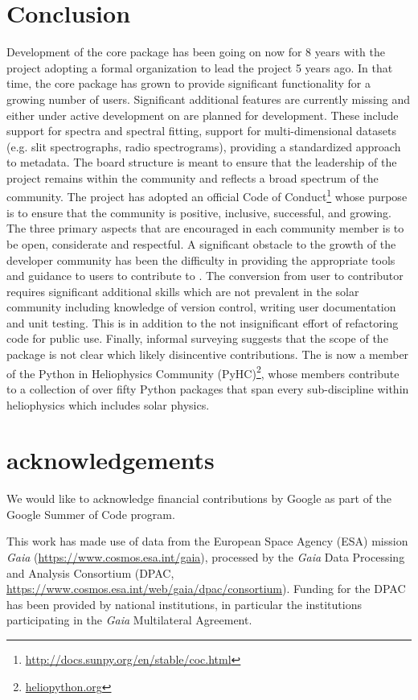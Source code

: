 \section{Conclusion}
\label{sec:conclusion}


Development of the \sunpypkg core package has been going on now for 8 years with the project adopting a formal organization to lead the project 5 years ago.
In that time, the core package has grown to provide significant functionality for a growing number of users.
Significant additional features are currently missing and either under active development on are planned for development.
These include support for spectra and spectral fitting, support for multi-dimensional datasets (e.g. slit spectrographs, radio spectrograms), providing a standardized approach to metadata.
The board structure is meant to ensure that the leadership of the project remains within the community and reflects a broad spectrum of the community.
The project has adopted an official Code of Conduct\footnote{\url{http://docs.sunpy.org/en/stable/coc.html}} whose purpose is to ensure that the \sunpy community is positive, inclusive, successful, and growing.
The three primary aspects that are encouraged in each community member is to be open, considerate and respectful.
A significant obstacle to the growth of the developer community has been the difficulty in providing the appropriate tools and guidance to users to contribute to \sunpypkg.
The conversion from user to contributor requires significant additional skills which are not prevalent in the solar community including knowledge of version control, writing user documentation and unit testing.
This is in addition to the not insignificant effort of refactoring code for public use.
Finally, informal surveying suggests that the scope of the \sunpypkg package is not clear which likely disincentive contributions.
The \sunpyproj is now a member of the Python in Heliophysics Community (PyHC)\footnote{\url{heliopython.org}}, whose members contribute to a collection of over fifty Python packages that span every sub-discipline within heliophysics which includes solar physics.

\section{acknowledgements}

We would like to acknowledge financial contributions by Google as part of the Google Summer of Code program.

This work has made use of data from the European Space Agency (ESA) mission {\it Gaia} (\url{https://www.cosmos.esa.int/gaia}), processed by the {\it Gaia} Data Processing and Analysis Consortium (DPAC, \url{https://www.cosmos.esa.int/web/gaia/dpac/consortium}).
Funding for the DPAC has been provided by national institutions, in particular the institutions participating in the {\it Gaia} Multilateral Agreement.
